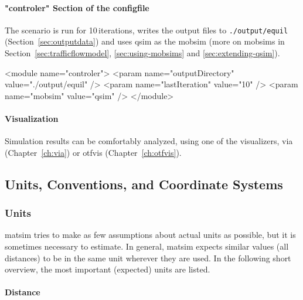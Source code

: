 \paragraph{"controler" Section of the \protect\gls{configfile}}

The scenario is run for 10\,iterations, writes the output files to \lstinline|./output/equil| (Section~\ref{sec:outputdata}) and uses \gls{qsim} as the \gls{mobsim} (more on \glspl{mobsim} in Section~\ref{sec:trafficflowmodel}, \ref{sec:using-mobsims} and \ref{sec:extending-qsim}).
\begin{xml}
<module name="controler">
   <param name="outputDirectory" value="./output/equil" />
   <param name="lastIteration" value="10" />
   <param name="mobsim" value="qsim" />	
</module>
\end{xml}


\paragraph{Visualization}

Simulation results can be comfortably analyzed, using one of the visualizers, \gls{via} (Chapter~\ref{ch:via}) or \gls{otfvis} (Chapter~\ref{ch:otfvis}).

\subsection{Units, Conventions, and Coordinate Systems}
\label{sec:unitsconventions}
\subsubsection{Units}
\gls{matsim} tries to make as few assumptions about actual units as possible, but it is sometimes necessary to estimate. In general, \gls{matsim} expects similar values (\eg all distances) to be in the same unit wherever they are used. In the following short overview, the most important (expected) units are listed.

\paragraph{Distance}

